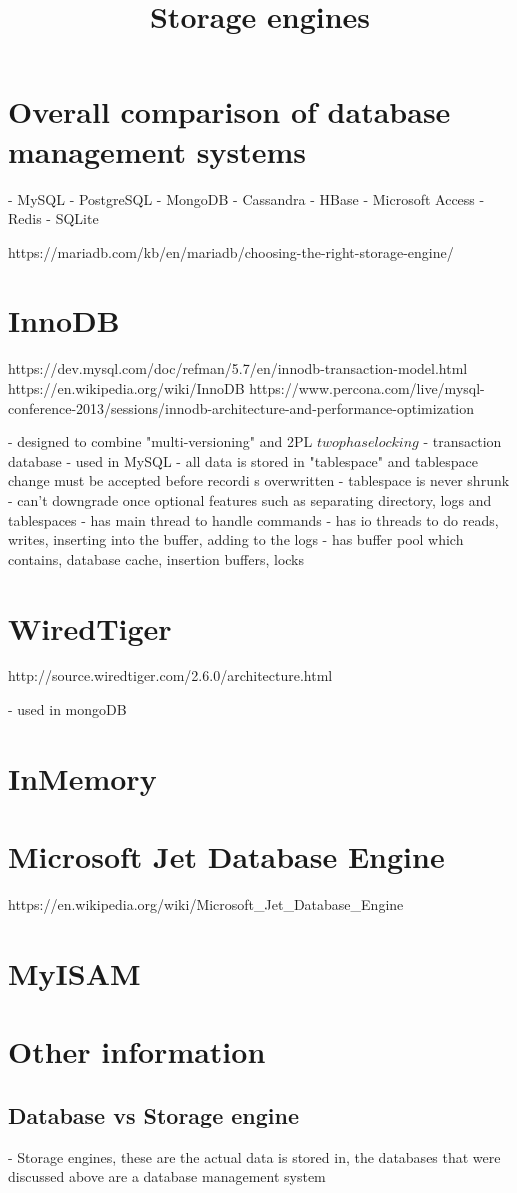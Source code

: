 \chapter{Overall comparison of database management systems}

- MySQL
- PostgreSQL
- MongoDB
- Cassandra
- HBase
- Microsoft Access
- Redis
- SQLite


\title{Storage engines}
https://mariadb.com/kb/en/mariadb/choosing-the-right-storage-engine/

\chapter{InnoDB}
https://dev.mysql.com/doc/refman/5.7/en/innodb-transaction-model.html
https://en.wikipedia.org/wiki/InnoDB
https://www.percona.com/live/mysql-conference-2013/sessions/innodb-architecture-and-performance-optimization

- designed to combine "multi-versioning" and 2PL \(two phase locking\)
- transaction database
- used in MySQL
- all data is stored in "tablespace" and tablespace change must be accepted before recordi s overwritten
- tablespace is never shrunk
- can't downgrade once optional features such as separating directory, logs and tablespaces
- has main thread to handle commands
- has io threads to do reads, writes, inserting into the buffer, adding to the logs
- has buffer pool which contains, database cache, insertion buffers, locks

\chapter{WiredTiger}
http://source.wiredtiger.com/2.6.0/architecture.html

- used in mongoDB

\chapter{InMemory}


\chapter{Microsoft Jet Database Engine}
https://en.wikipedia.org/wiki/Microsoft_Jet_Database_Engine

\chapter{MyISAM}


\chapter{Other information}

\section{Database vs Storage engine}
- Storage engines, these are the actual data is stored in, the databases that were discussed above are a database management system
